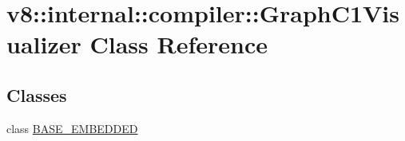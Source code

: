 \hypertarget{classv8_1_1internal_1_1compiler_1_1_graph_c1_visualizer}{}\section{v8\+:\+:internal\+:\+:compiler\+:\+:Graph\+C1\+Visualizer Class Reference}
\label{classv8_1_1internal_1_1compiler_1_1_graph_c1_visualizer}
\subsection*{Classes}
\begin{DoxyCompactItemize}
\item 
class \hyperlink{classv8_1_1internal_1_1compiler_1_1_graph_c1_visualizer_1_1_b_a_s_e___e_m_b_e_d_d_e_d}{B\+A\+S\+E\+\_\+\+E\+M\+B\+E\+D\+D\+ED}
\end{DoxyCompactItemize}

